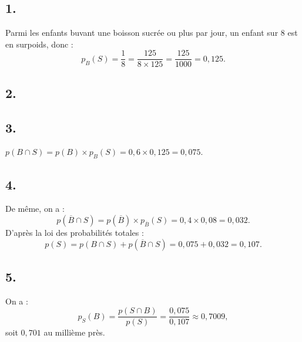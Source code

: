 \subsection*{1.}

Parmi les enfants buvant une boisson sucrée ou plus par jour, un enfant sur 8 est en surpoids, donc :
\[
p_B(S) = \frac{1}{8} = \frac{125}{8 \times 125} = \frac{125}{1000} = 0{,}125.
\]

\subsection*{2.}

\begin{center}
\end{center}

\subsection*{3.}

\(p(B \cap S) = p(B) \times p_B(S) = 0{,}6 \times 0{,}125 = 0{,}075\).

\subsection*{4.}

De même, on a :
\[
p(\overline{B} \cap S) = p(\overline{B}) \times p_{\overline{B}}(S) = 0{,}4 \times 0{,}08 = 0{,}032.
\]
D'après la loi des probabilités totales :
\[
p(S) = p(B \cap S) + p(\overline{B} \cap S) = 0{,}075 + 0{,}032 = 0{,}107.
\]

\subsection*{5.}

On a :
\[
p_S(B) = \frac{p(S \cap B)}{p(S)} = \frac{0{,}075}{0{,}107} \approx 0{,}7009,
\]
soit  \( 0{,}701 \) au millième près.
